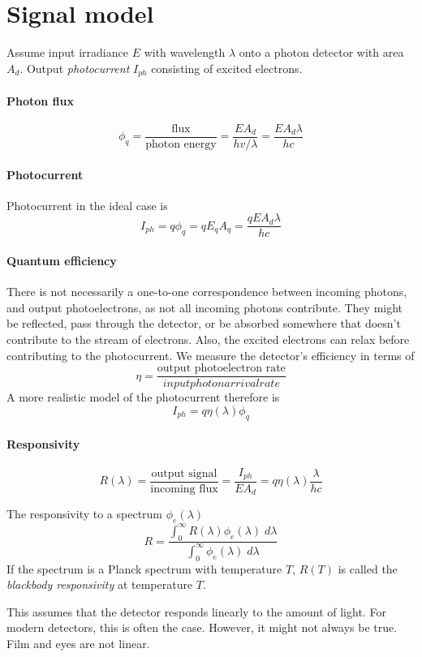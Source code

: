 \documentclass[article]{memoir}
\begin{document}
\section{Signal model}
Assume input irradiance \(E\) with wavelength \(\lambda\) onto a photon detector with area \(A_d\). Output \emph{photocurrent} \(I_{ph}\) consisting of excited electrons.

\paragraph{Photon flux}
\[
    \phi_q = \frac{\text{flux}}{\text{photon energy}} = \frac{EA_d}{hv/\lambda} = \frac{EA_d\lambda}{hc}
\]
\paragraph{Photocurrent}
Photocurrent in the ideal case is
\[
    I_{ph} = q \phi_q = q E_q A_q = \frac{q E A_d \lambda}{hc}
\]
\paragraph{Quantum efficiency}
There is not necessarily a one-to-one correspondence between incoming photons, and output photoelectrons, as not all incoming photons contribute. They might be reflected, pass through the detector, or be absorbed somewhere that doesn't contribute to the stream of electrons. Also, the excited electrons can relax before contributing to the photocurrent. We measure the detector's efficiency in terms of
\[
    \eta = \frac{\text{output photoelectron rate}}{input photon arrival rate}
\]
A more realistic model of the photocurrent therefore is
\[
    I_{ph} = q \eta(\lambda) \phi_q
\]
\paragraph{Responsivity}
\[
    R(\lambda) = \frac{\text{output signal}}{\text{incoming flux}} = \frac{I_{ph}}{EA_d} = q \eta(\lambda) \frac{\lambda}{hc}
\]

The responsivity to a spectrum \(\phi_e(\lambda)\)
\[
    R = \frac{\int_0^\infty R(\lambda)\phi_{e}(\lambda)\; d\lambda}{\int_0^\infty \phi_e(\lambda)\; d\lambda}
\]
If the spectrum is a Planck spectrum with temperature \(T\), \(R(T)\) is called the \emph{blackbody responsivity} at temperature \(T\).

This assumes that the detector responds linearly to the amount of light. For modern detectors, this is often the case. However, it might not always be true. Film and eyes are not linear.
\end{document}
